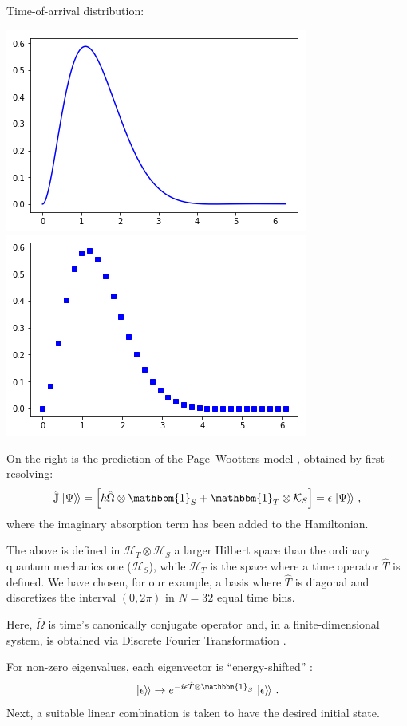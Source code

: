 \documentclass[a0,portrait]{a0poster}
\newcommand{\idop}{\mathbbm{1}}           %
\newcommand{\hilb}[1]{\mathcal{#1}}       %
\newcommand{\ox}{\otimes}
\newcommand{\smallback}{\hspace{-0.115em}}
\newcommand{\dket}[1]{\left.\left| #1 \right\rangle\smallback\right\rangle}
\newcommand{\pwspace}{\hilb{H}_T \ox \hilb{H}_S}
\begin{document}
\begin{multicols}{2}
Time-of-arrival distribution:
\begin{center}\vspace{1cm}
  \includegraphics[width=0.4\linewidth]{2ldetect/toa-cont.png}
  \includegraphics[width=0.4\linewidth]{2ldetect/toa-pw.png}
\end{center}\vspace{1cm}
On the right is the prediction of the Page--Wootters model \cite{Lloyd:Time},
obtained by first resolving:
\begin{equation}
  \hat{\mathbb{J}} \dket{\Psi} = \left[ \hbar\hat{\Omega}\ox\idop_S + \idop_T\ox\mathcal{K}_S \right] = \epsilon\dket{\Psi} \,\text{,}
\end{equation}
where the imaginary absorption term has been added to the Hamiltonian.

The above is defined in $\pwspace$ a larger Hilbert space than
the ordinary quantum mechanics one ($\hilb{H}_S$), while $\hilb{H}_T$
is the space where
a time operator $\hat{T}$ is defined. We have chosen, for our example,
a basis where $\hat{T}$
is diagonal and discretizes the interval $(0, 2\pi)$ in $N=32$
equal time bins.

Here, $\bar\Omega$ is time's canonically conjugate operator and,
in a finite-dimensional system, is obtained via Discrete Fourier Transformation
\cite{FiniteHilb}.

For non-zero eigenvalues, each eigenvector
is ``energy-shifted'' \cite{Lloyd:Time}:
\begin{equation}\label{eq:energyfix}
  \dket{\epsilon} \rightarrow e^{-i\epsilon\hat{T} \ox \idop_S} \dket{\epsilon}
  \,\text{.}
\end{equation}
Next, a suitable linear combination is taken to have the desired initial state.


\end{multicols}
\end{document}

